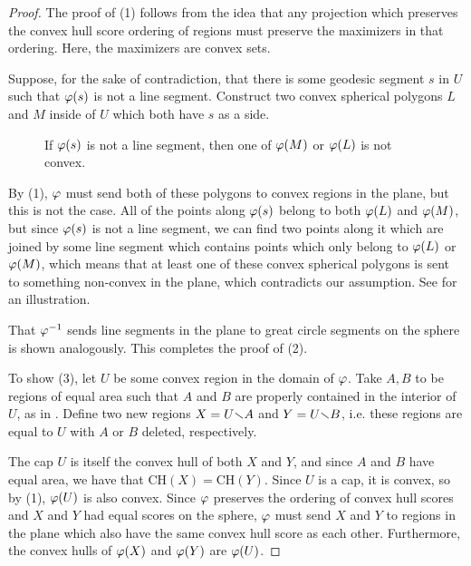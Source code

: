 \begin{proof}



		The proof of (1) follows from the idea that any projection which preserves the convex hull score ordering of regions must 
		preserve the maximizers in that ordering.   Here, the maximizers are convex sets.
		
		 Suppose, for the sake of contradiction, that there is some geodesic segment $s$ in $U$ such that $\varphi(s)$ is not a line segment. Construct two convex spherical polygons $L$ and $M$ inside of $U$ which both have $s$ as a side. 










		

		
\begin{figure}[h]
	\centering
	
	\caption{If $\varphi(s)$ is not a line segment, then one of $\varphi(M)$ or $\varphi(L)$ is not convex.}
	\label{fig:lineconvexcont}
\end{figure}

		 By (1), $\varphi$ must send both of these polygons to convex regions in the plane, but this is not the case.  All of the points along $\varphi(s)$ belong to both $\varphi(L)$ and $\varphi(M)$, but since $\varphi(s)$ is not a line segment, we can find two points along it which are joined by some line segment which contains points which only belong to $\varphi(L)$ or $\varphi(M)$, which means that at least one of these convex spherical polygons is sent to something non-convex in the plane, which contradicts our assumption.		See  for an illustration.
		
		That $\varphi^{-1}$ sends line segments in the plane to great circle segments on the sphere is shown analogously.  
		This completes the proof of (2).
		
		
		
 To show (3), let $U$ be some convex region in the domain of $\varphi$.  Take $A,B$ to be regions of equal area such that $A$ and $B$ are properly contained in the interior of $U$, as in .  Define two new regions $X=U{\smallsetminus} A$ and $Y=U{\smallsetminus} B$, i.e. these regions are equal to $U$ with $A$ or $B$ deleted, respectively.  

The cap $U$ is itself the convex hull of both $X$ and $Y$, and since $A$ and $B$ have equal area, we have that $\mathrm{CH}(X) = \mathrm{CH}(Y)$.  Since $U$ is a cap, it is convex, so by (1), $\varphi(U)$ is also convex.  Since $\varphi$ preserves the ordering of convex hull scores and $X$ and $Y$ had equal scores on the sphere, $\varphi$ must send $X$ and $Y$ to regions in the plane which also have the same convex hull score as each other.  Furthermore, the convex hulls of $\varphi(X)$ and $\varphi(Y)$ are $\varphi(U)$.


\end{proof}
